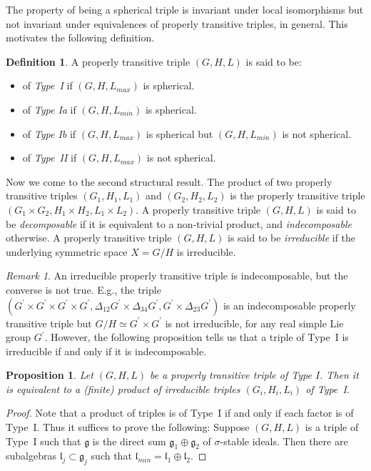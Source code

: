 \documentclass[10]{amsart}
\newtheorem{pro}[thm]{Proposition}
\theoremstyle{remark}
\newtheorem{rem}[thm]{Remark}
\theoremstyle{definition}
\newtheorem{Def}[thm]{Definition}
\numberwithin{equation}{section}
\newcommand{\fg}{{\mathfrak g}}
\newcommand{\fl}{{\mathfrak l}}
\begin{document}
{The property of being a spherical triple is invariant under local isomorphisms but not invariant under equivalences of properly transitive triples, in general. This motivates the following definition.
\begin{Def}\label{types}
A properly transitive triple $(G,H,L)$ is said to be:
\begin{itemize}
\item[(i)] of {\it Type~I} if $(G,H,L_{max})$ is spherical.
\item[(ii)]  of {\it Type Ia} if $(G,H,L_{min})$ is spherical.
\item[(iii)] of {\it Type Ib} if $(G,H,L_{max})$ is spherical but $(G,H,L_{min})$ is not spherical.
\item[(iv)] of {\it Type~II} if $(G,H,L_{max})$ is not spherical.
\end{itemize}
\end{Def}
\noindent
Now we come to the second structural result.
The product of two properly transitive triples $(G_1,H_1,L_1)$ and $(G_2,H_2,L_2)$ is the properly transitive triple $(G_1\times G_2, H_1\times H_2, L_1\times L_2)$.
A properly transitive triple $(G,H,L)$ is said to be {\it decomposable} if it is equivalent to a non-trivial product, and {\it indecomposable} otherwise. A properly transitive triple $(G,H,L)$ is said to be {\it irreducible} if the  underlying symmetric 
space $X=G/H$ is irreducible.

\begin{rem}\label{remindecomp}
An irreducible properly transitive triple is indecomposable, but the converse is not true. E.g., the triple $(G^\prime\times G^\prime\times G^\prime\times G^\prime,\Delta_{12}G^\prime\times\Delta_{34}G^\prime,G^\prime\times\Delta_{23}G^\prime)$ 
is an indecomposable properly transitive triple but $G/H\simeq G^\prime\times G^\prime$ is not irreducible, for any real simple Lie group $G^\prime$. However, the following proposition
tells us that a triple of Type~I  is irreducible if and only if it is indecomposable.
\end{rem}
%
\begin{pro}\label{productck}
Let $(G,H,L)$ be a properly transitive triple of Type $I$. Then it is equivalent to a (finite) product of irreducible triples $(G_i,H_i, L_i)$ of Type~I.
\end{pro}
%
\begin{proof}
Note that a product of triples is of Type~I if and only if each factor is of Type~I. Thus it suffices to prove the following: Suppose $(G,H,L)$ is a triple of Type~I such that $\fg$ is the direct sum $\fg_1\oplus\fg_2$ of $\sigma$-stable ideals. Then there are subalgebras $\fl_j\subset \fg_j$ such that $\fl_{min}=\fl_1\oplus \fl_2$. 


\end{proof}}
\end{document}
